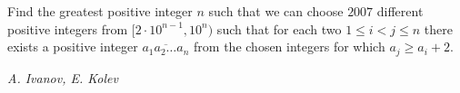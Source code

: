 Find the greatest positive integer $n$ such that we can choose $2007$ different positive integers from $[2\cdot 10^{n-1},10^{n})$ such that for each two $1\leq i<j\leq n$ there exists a positive integer $\overline{a_{1}a_{2}\ldots a_{n}}$ from the chosen integers for which $a_{j}\geq a_{i}+2$.

\textit{A. Ivanov, E. Kolev}